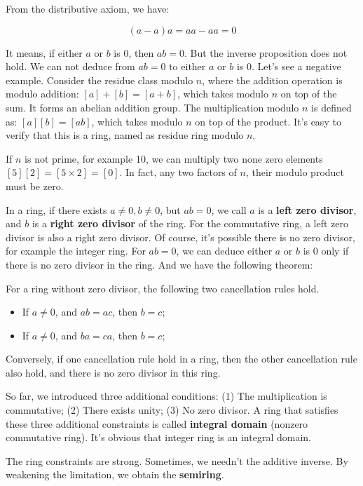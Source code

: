 \documentclass{article}
\begin{document}
From the distributive axiom, we have:

\[
(a - a)a = aa - aa = 0
\]

It means, if either $a$ or $b$ is 0, then $ab = 0$. But the inverse proposition does not hold. We can not deduce from $ab =0$ to either $a$ or $b$ is 0. Let's see a negative example. Consider the residue class modulo $n$, where the addition operation is modulo addition: $[a] + [b] = [a + b]$, which takes modulo $n$ on top of the sum. It forms an abelian addition group. The multiplication modulo $n$ is defined as: $[a][b] = [ab]$, which takes modulo $n$ on top of the product. It's easy to verify that this is a ring, named as residue ring modulo $n$.

If $n$ is not prime, for example 10, we can multiply two none zero elements $[5][2] = [5 \times 2] = [0]$. In fact, any two factors of $n$, their modulo product must be zero.

In a ring, if there exists $a \neq 0, b \neq 0$, but $ab = 0$, we call $a$ is a \textbf{left zero divisor}, and $b$ is a \textbf{right zero divisor} of the ring. For the commutative ring, a left zero divisor is also a right zero divisor. Of course, it's possible there is no zero divisor, for example the integer ring. For $ab = 0$, we can deduce either $a$ or $b$ is 0 only if there is no zero divisor in the ring. And we have the following theorem:

\begin{theorem}
For a ring without zero divisor, the following two cancellation rules hold.
\begin{itemize}
\item If $a \neq 0$, and $ab = ac$, then $b = c$;
\item If $a \neq 0$, and $ba = ca$, then $b = c$;
\end{itemize}
\end{theorem}

Conversely, if one cancellation rule hold in a ring, then the other cancellation rule also hold, and there is no zero divisor in this ring.

So far, we introduced three additional conditions: (1) The multiplication is commutative; (2) There exists unity; (3) No zero divisor. A ring that satisfies these three additional constraints is called \textbf{integral domain} (nonzero commutative ring). It's obvious that integer ring is an integral domain.

The ring constraints are strong. Sometimes, we needn't the additive inverse. By weakening the limitation, we obtain the \textbf{semiring}.
\end{document}
